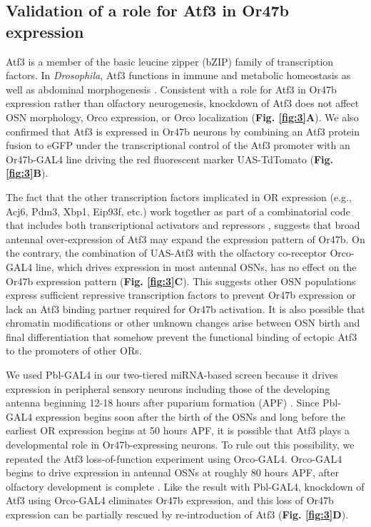 \subsection*{Validation of a role for Atf3 in Or47b expression}

Atf3 is a member of the basic leucine zipper (bZIP) family of transcription factors.
In \emph{Drosophila}, Atf3 functions in immune and metabolic homeostasis as well as abdominal morphogenesis \cite{Brodesser_Jindra_Uhlirova_2012,a_Bohmann_Jindra_Uhlirova_2009}.
Consistent with a role for Atf3 in Or47b expression rather than olfactory neurogenesis, knockdown of Atf3 does not affect OSN morphology, Orco expression, or Orco localization (\textbf{Fig. \ref{fig:3}A}).
We also confirmed that Atf3 is expressed in Or47b neurons by combining an Atf3 protein fusion to eGFP under the transcriptional control of the Atf3 promoter with an Or47b-GAL4 line driving the red fluorescent marker UAS-TdTomato (\textbf{Fig. \ref{fig:3}B}).

The fact that the other transcription factors implicated in OR expression (e.g., Acj6, Pdm3, Xbp1, Eip93f, etc.) work together as part of a combinatorial code that includes both transcriptional activators and repressors \cite{Brochtrup_Hummel_Alenius_2012}, suggests that broad antennal over-expression of Atf3 may expand the expression pattern of Or47b.
On the contrary, the combination of UAS-Atf3 with the olfactory co-receptor Orco-GAL4 line, which drives expression in most antennal OSNs, has no effect on the Or47b expression pattern (\textbf{Fig. \ref{fig:3}C}).
This suggests other OSN populations express sufficient repressive transcription factors to prevent Or47b expression or lack an Atf3 binding partner required for Or47b activation. It is also possible that chromatin modifications or other unknown changes arise between OSN birth and final differentiation that somehow prevent the functional binding of ectopic Atf3 to the promoters of other ORs.

We used Pbl-GAL4 in our two-tiered miRNA-based screen because it drives expression in peripheral sensory neurons including those of the developing antenna beginning 12-18 hours after puparium formation (APF) \cite{dnik_Dickson_Luo_Komiyama_2007}.
Since Pbl-GAL4 expression begins soon after the birth of the OSNs and long before the earliest OR expression begins at 50 hours APF, it is possible that Atf3 plays a developmental role in Or47b-expressing neurons.
To rule out this possibility, we repeated the Atf3 loss-of-function experiment using Orco-GAL4.
Orco-GAL4 begins to drive expression in antennal OSNs at roughly 80 hours APF, after olfactory development is complete \cite{s_Chiappe_Amrein_Vosshall_2004}.
Like the result with Pbl-GAL4, knockdown of Atf3 using Orco-GAL4 eliminates Or47b expression, and this loss of Or47b expression can be partially rescued by re-introduction of Atf3 (\textbf{Fig. \ref{fig:3}D}).
